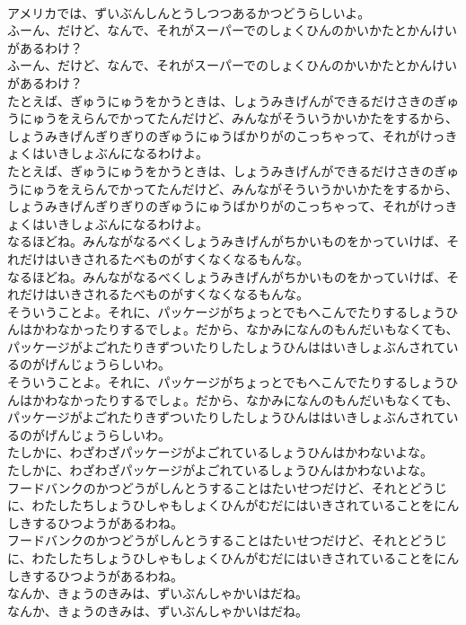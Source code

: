 \documentclass[8pt]{extreport}
\begin{document}
\begin{CJK}{UTF8}{min}
\\	アメリカでは、ずいぶんしんとうしつつあるかつどうらしいよ。
\\	ふーん、だけど、なんで、それがスーパーでのしょくひんのかいかたとかんけいがあるわけ？
\\	ふーん、だけど、なんで、それがスーパーでのしょくひんのかいかたとかんけいがあるわけ？
\\	たとえば、ぎゅうにゅうをかうときは、しょうみきげんができるだけさきのぎゅうにゅうをえらんでかってたんだけど、みんながそういうかいかたをするから、しょうみきげんぎりぎりのぎゅうにゅうばかりがのこっちゃって、それがけっきょくはいきしょぶんになるわけよ。
\\	たとえば、ぎゅうにゅうをかうときは、しょうみきげんができるだけさきのぎゅうにゅうをえらんでかってたんだけど、みんながそういうかいかたをするから、しょうみきげんぎりぎりのぎゅうにゅうばかりがのこっちゃって、それがけっきょくはいきしょぶんになるわけよ。
\\	なるほどね。みんながなるべくしょうみきげんがちかいものをかっていけば、それだけはいきされるたべものがすくなくなるもんな。
\\	なるほどね。みんながなるべくしょうみきげんがちかいものをかっていけば、それだけはいきされるたべものがすくなくなるもんな。
\\	そういうことよ。それに、パッケージがちょっとでもへこんでたりするしょうひんはかわなかったりするでしょ。だから、なかみになんのもんだいもなくても、パッケージがよごれたりきずついたりしたしょうひんははいきしょぶんされているのがげんじょうらしいわ。
\\	そういうことよ。それに、パッケージがちょっとでもへこんでたりするしょうひんはかわなかったりするでしょ。だから、なかみになんのもんだいもなくても、パッケージがよごれたりきずついたりしたしょうひんははいきしょぶんされているのがげんじょうらしいわ。
\\	たしかに、わざわざパッケージがよごれているしょうひんはかわないよな。
\\	たしかに、わざわざパッケージがよごれているしょうひんはかわないよな。
\\	フードバンクのかつどうがしんとうすることはたいせつだけど、それとどうじに、わたしたちしょうひしゃもしょくひんがむだにはいきされていることをにんしきするひつようがあるわね。
\\	フードバンクのかつどうがしんとうすることはたいせつだけど、それとどうじに、わたしたちしょうひしゃもしょくひんがむだにはいきされていることをにんしきするひつようがあるわね。
\\	なんか、きょうのきみは、ずいぶんしゃかいはだね。
\\	なんか、きょうのきみは、ずいぶんしゃかいはだね。

\end{CJK}
\end{document}
